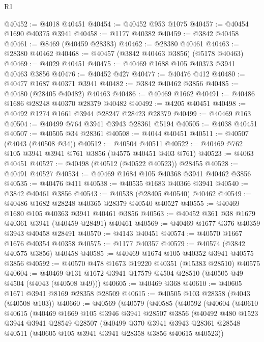 \begin{lexlean}{R1}
\begin{coremodule}
@40452 := @4018 @40451
@40454 := @40452 @953 @1075
@40457 := @40454 @1690 @40375 @3941
@40458 := @1177 @40382
@40459 := @3842 @40458
@40461 := @8469 (@40459 @28383)
@40462 := @28380 @40461
@40463 := @28380 @40462
@40468 := @40457 (@3842 @40463 @3856) (@5178 @40463)
@40469 := @4029 @40451
@40475 := @40469 @1688 @105 @40373 @3941 @40463 @3856
@40476 := @40452 @427
@40477 := @40476 @412
@40480 := @40477 @1687 @40371 @3941
@40482 := @3842 @40462 @3856
@40485 := @40480 (@28405 @40482) @40463
@40486 := @40469 @1662
@40491 := @40486 @1686 @28248 @40370 @28379 @40482
@40492 := @4205 @40451
@40498 := @40492 @1274 @1661 @3944 @28247 @28423 @28379
@40499 := @40469 @163
@40504 := @40499 @764 @3941 @3943 @28361 @5194
@40505 := @4038 @40451
@40507 := @40505 @34 @28361
@40508 := @4044 @40451
@40511 := @40507 (@4043 (@40508 @34))
@40512 := @40504 @40511
@40522 := @40469 @762 @105 @3941 @3941 @761 @3856 (@4575 @40451 @403 @761)
@40523 := @4063 @40451
@40527 := @40498 (@40512 (@40522 @40523)) @28455
@40528 := @40491 @40527
@40534 := @40469 @1684 @105 @40368 @3941 @40462 @3856
@40535 := @40476 @411
@40538 := @40535 @1683 @40366 @3941
@40540 := @3842 @40461 @3856
@40543 := @40538 (@28405 @40540) @40462
@40549 := @40486 @1682 @28248 @40365 @28379 @40540 @40527
@40555 := @40469 @1680 @105 @40363 @3941 @40461 @3856
@40563 := @40452 @361 @38 @1679 @40361 @3941 (@40459 @28491) @40461
@40569 := @40469 @1677 @376 @40359 @3943 @40458 @28491
@40570 := @4143 @40451
@40574 := @40570 @1667 @1676 @40354 @40358
@40575 := @1177 @40357
@40579 := @40574 (@3842 @40575 @3856) @40458
@40585 := @40469 @1674 @105 @40352 @3941 @40575 @3856
@40592 := @40570 @478 @1673 @19220 @40351 (@15383 @28510) @40575
@40604 := @40469 @131 @1672 @3941 @17579 @4504 @28510 (@40505 @49 @4504 (@4043 (@40508 @49)))
@40605 := @40469 @368
@40610 := @40605 @1671 @3941 @8169 @28358 @28509
@40615 := @40505 @103 @28358 (@4043 (@40508 @103))
@40660 := @40569
    (@40579
      (@40585
        (@40592
          (@40604
            (@40610
              @40615
              (@40469
                @1669
                @105
                @3946
                @3941
                @28507
                @3856
                (@40492
                  @480
                  @1523
                  @3944
                  @3941
                  @28549
                  @28507
                  (@40499
                    @370
                    @3941
                    @3943
                    @28361
                    @28548
                    @40511
                    (@40605 @105 @3941 @3941 @28358 @3856 @40615 @40523))

\end{coremodule}
\end{lexlean}

